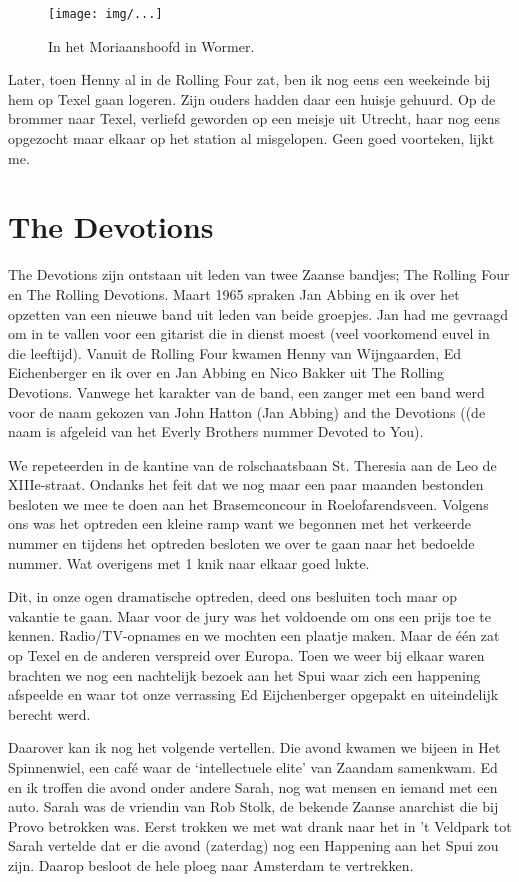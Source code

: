 \documentclass[10pt,twoside,openright]{memoir}
\begin{document}
\begin{figure}[t]
\texttt{[image: img/...]}
\caption{In het Moriaanshoofd in Wormer.}
\end{figure}

Later, toen Henny al in de Rolling Four zat, ben ik nog eens een weekeinde bij hem op Texel gaan logeren. Zijn ouders hadden daar een huisje gehuurd. Op de brommer naar Texel, verliefd geworden op een meisje uit Utrecht, haar nog eens opgezocht maar elkaar op het station al misgelopen. Geen goed voorteken, lijkt me.

\chapter{The Devotions} %
\label{cha:devotions}

The Devotions zijn ontstaan uit leden van twee Zaanse bandjes; The Rolling Four en The Rolling Devotions. Maart 1965 spraken Jan Abbing en ik over het opzetten van een nieuwe band uit leden van beide groepjes. Jan had me gevraagd om in te vallen voor een gitarist die in dienst moest (veel voorkomend euvel in die leeftijd). Vanuit de Rolling Four kwamen Henny van Wijngaarden, Ed Eichenberger en ik over en Jan Abbing en Nico Bakker uit The Rolling Devotions. Vanwege het karakter van de band, een zanger met een band werd voor de naam gekozen van John Hatton (Jan Abbing) and the Devotions ((de naam is afgeleid van het Everly Brothers nummer Devoted to You).

We repeteerden in de kantine van de rolschaatsbaan St. Theresia aan de Leo de XIIIe-straat. Ondanks het feit dat we nog maar een paar maanden bestonden besloten we mee te doen aan het Brasemconcour in Roelofarendsveen. Volgens ons was het optreden een kleine ramp want we begonnen met het verkeerde nummer en tijdens het optreden besloten we over te gaan naar het bedoelde nummer. Wat overigens met 1 knik naar elkaar goed lukte. 

Dit, in onze ogen dramatische optreden, deed ons besluiten toch maar op vakantie te gaan. Maar voor de jury was het voldoende om ons een prijs toe te kennen. Radio/TV-opnames en we mochten een plaatje maken. Maar de één zat op Texel en de anderen verspreid over Europa. Toen we weer bij elkaar waren brachten we nog een nachtelijk bezoek aan het Spui waar zich een happening afspeelde en waar tot onze verrassing Ed Eijchenberger opgepakt en uiteindelijk berecht werd.

Daarover kan ik nog het volgende vertellen. Die avond kwamen we bijeen in Het Spinnenwiel, een café waar de ‘intellectuele elite’ van Zaandam samenkwam. Ed en ik troffen die avond onder andere Sarah, nog wat mensen en iemand met een auto. Sarah was de vriendin van Rob Stolk, de bekende Zaanse anarchist die bij Provo betrokken was. Eerst trokken we met wat drank naar het in ’t Veldpark tot Sarah vertelde dat er die avond (zaterdag) nog een Happening aan het Spui zou zijn. Daarop besloot de hele ploeg naar Amsterdam te vertrekken. 
\end{document}
